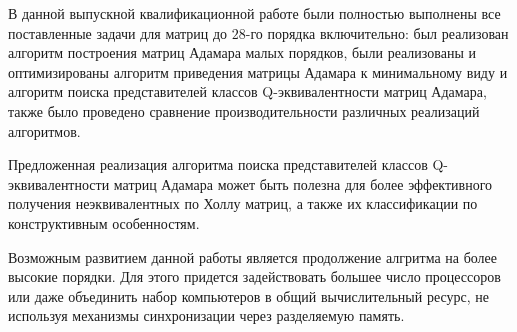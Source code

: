 \Conclusion

В данной выпускной квалификационной работе были полностью выполнены все поставленные задачи для матриц до $28$-го порядка включительно: был реализован алгоритм построения матриц Адамара малых порядков, были реализованы и оптимизированы алгоритм приведения матрицы Адамара к минимальному виду и алгоритм поиска представителей классов Q-эквивалентности матриц Адамара, также было проведено сравнение производительности различных реализаций алгоритмов.

Предложенная реализация алгоритма поиска представителей классов Q-эквивалентности матриц Адамара может быть полезна для более эффективного получения неэквивалентных по Холлу матриц, а также их классификации по конструктивным особенностям.

Возможным развитием данной работы является продолжение алгритма на более высокие порядки. Для этого придется задействовать большее число процессоров или даже объединить набор компьютеров в общий вычислительный ресурс, не используя механизмы синхронизации через разделяемую память.

